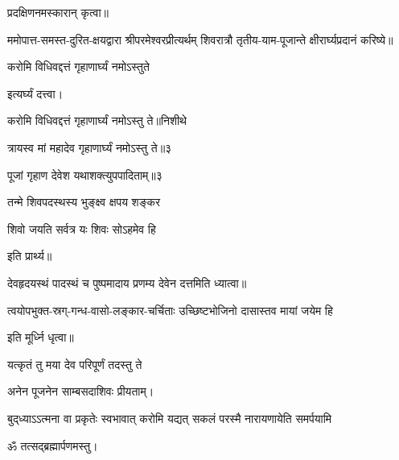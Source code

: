 प्रदक्षिणनमस्कारान् कृत्वा॥

ममोपात्त-समस्त-दुरित-क्षयद्वारा श्रीपरमेश्वरप्रीत्यर्थम् शिवरात्रौ तृतीय-याम-पूजान्ते क्षीरार्घ्यप्रदानं करिष्ये॥

{करोमि विधिवद्दत्तं गृहाणार्घ्यं नमोऽस्तुते}

इत्यर्घ्यं दत्त्वा।
\medskip

{करोमि विधिवद्दत्तं गृहाणार्घ्यं नमोऽस्तु ते॥निशीथे}

{त्रायस्व मां महादेव गृहाणार्घ्यं नमोऽस्तु ते॥३} 



{पूजां गृहाण देवेश यथाशक्त्युपपादिताम्॥३}


{तन्मे शिवपदस्थस्य भुङ्क्ष्व क्षपय शङ्कर}

{शिवो जयति सर्वत्र यः शिवः सोऽहमेव हि}

इति प्रार्थ्य॥

 देवहृदयस्थं पादस्थं च पुष्पमादाय प्रणम्य देवेन दत्तमिति ध्यात्वा॥

{त्वयोपभुक्त-स्रग्-गन्ध-वासो-लङ्कार-चर्चिताः}
{उच्छिष्टभोजिनो दासास्तव मायां जयेम हि}

इति मूर्ध्नि धृत्वा॥

{यत्कृतं तु मया देव परिपूर्णं तदस्तु ते}


अनेन पूजनेन साम्बसदाशिवः प्रीयताम्। 

{बुद्‌ध्याऽऽत्मना वा प्रकृतेः स्वभावात्}
{करोमि यद्यत् सकलं परस्मै}
{नारायणायेति समर्पयामि}


ॐ तत्सद्ब्रह्मार्पणमस्तु।\medskip
